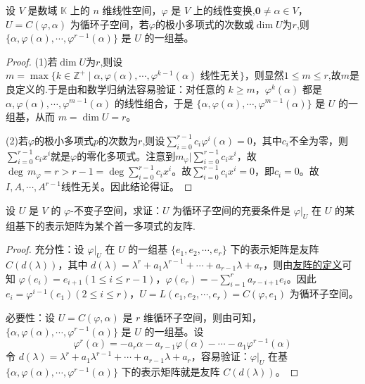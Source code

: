 \documentclass[../../main.tex]{subfiles}
\begin{document}
\begin{theorem}\label{theorem:循环子空间的基}
设 \(V\) 是数域 \(\mathbb{K}\) 上的 \(n\) 维线性空间，\(\varphi\) 是 \(V\) 上的线性变换,\(\mathbf{0}\neq\alpha\in V\)， \(U = C(\varphi,\alpha)\) 为循环子空间，若$\varphi$的极小多项式的次数或$\dim U$为$r$,则\(\{\alpha,\varphi(\alpha),\cdots,\varphi^{r - 1}(\alpha)\}\) 是 \(U\) 的一组基。
\end{theorem}
\begin{proof}
(1)若$\dim U$为$r$,则设 \(m = \max\{k\in\mathbb{Z}^+\mid\alpha,\varphi(\alpha),\cdots,\varphi^{k - 1}(\alpha)\text{ 线性无关}\}\)，则显然$1\leqslant  m\leqslant  r$,故$m$是良定义的.于是由和数学归纳法容易验证：对任意的 \(k\geqslant  m\)，\(\varphi^k(\alpha)\) 都是 \(\alpha,\varphi(\alpha),\cdots,\varphi^{m - 1}(\alpha)\) 的线性组合，于是 \(\{\alpha,\varphi(\alpha),\cdots,\varphi^{m - 1}(\alpha)\}\) 是 \(U\) 的一组基，从而 \(m = \dim U = r\)。 

(2)若$\varphi$的极小多项式$p$的次数为$r$,则设$\sum_{i=0}^{r-1}c_i\varphi^i(\alpha)=0$，其中$c_i$不全为零，则$\sum_{i=0}^{r-1}c_ix^i$就是$\varphi$的零化多项式。注意到$m_{\varphi}|\sum_{i=0}^{r-1}c_ix^i$，故$\deg\,m_{\varphi}=r>r-1=\deg\sum_{i=0}^{r-1}c_ix^i$。故$\sum_{i=0}^{r-1}c_ix^i=0$，即$c_i=0$。故$I,A,\cdots,A^{r-1}$线性无关。因此结论得证。
\end{proof}

\begin{theorem}\label{theorem:不变子空间是循环子空间的充要条件}
设 \(U\) 是 \(V\) 的 \(\varphi\)-不变子空间，求证：\(U\) 为循环子空间的充要条件是 \(\varphi|_U\) 在 \(U\) 的某组基下的表示矩阵为某个首一多项式的友阵.
\end{theorem}
\begin{proof}
{\heiti 充分性：}设 \(\varphi|_U\) 在 \(U\) 的一组基 \(\{e_1,e_2,\cdots,e_r\}\) 下的表示矩阵是友阵 \(C(d(\lambda))\)，其中 \(d(\lambda)=\lambda^r + a_1\lambda^{r - 1}+\cdots + a_{r - 1}\lambda + a_r\)，则由\hyperref[proposition:多项式的友矩和Frobenius块]{友阵的定义}可知 \(\varphi(e_i)=e_{i + 1}(1\leqslant  i\leqslant  r - 1)\)，\(\varphi(e_r)=-\sum_{i = 1}^{r}a_{r - i + 1}e_i\)。因此 \(e_i=\varphi^{i - 1}(e_1)(2\leqslant  i\leqslant  r)\)，\(U = L(e_1,e_2,\cdots,e_r)=C(\varphi,e_1)\) 为循环子空间。

{\heiti 必要性：}设 \(U = C(\varphi,\alpha)\) 是 \(r\) 维循环子空间，则由可知，\(\{\alpha,\varphi(\alpha),\cdots,\varphi^{r - 1}(\alpha)\}\) 是 \(U\) 的一组基。设 
\[
\varphi^r(\alpha)=-a_r\alpha - a_{r - 1}\varphi(\alpha)-\cdots - a_1\varphi^{r - 1}(\alpha)
\]
令 \(d(\lambda)=\lambda^r + a_1\lambda^{r - 1}+\cdots + a_{r - 1}\lambda + a_r\)，容易验证：\(\varphi|_U\) 在基 \(\{\alpha,\varphi(\alpha),\cdots,\varphi^{r - 1}(\alpha)\}\) 下的表示矩阵就是友阵 \(C(d(\lambda))\)。
\end{proof}
\end{document}
